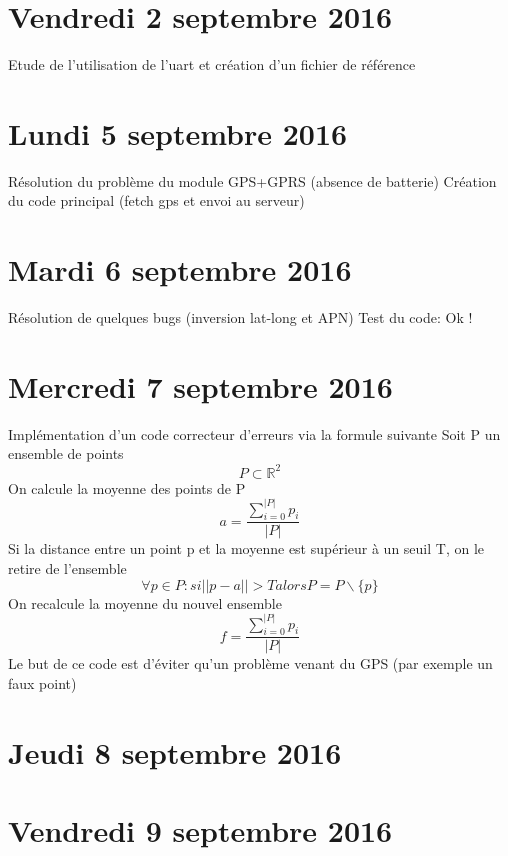 \documentclass[a4paper,11pt]{article}
\begin{document}
\section{Vendredi 2 septembre 2016}
Etude de l'utilisation de l'uart et création d'un fichier de référence

\section{Lundi 5 septembre 2016}
Résolution du problème du module GPS+GPRS (absence de batterie) \newline
Création du code principal (fetch gps et envoi au serveur) \newline

\section{Mardi 6 septembre 2016}
Résolution de quelques bugs (inversion lat-long et APN) \newline
Test du code: Ok !

\section{Mercredi 7 septembre 2016}
Implémentation d'un code correcteur d'erreurs via la formule suivante
Soit P un ensemble de points
\begin{equation*}
P \subset \mathbb{R}^2
\end{equation*}
On calcule la moyenne des points de P
\begin{equation*}
a = \frac{\sum\limits_{i=0}^{|P|} p_i}{|P|}
\end{equation*}
Si la distance entre un point p et la moyenne est supérieur à un seuil T, on le retire de l'ensemble
\begin{equation*}
\forall p \in P : si ||p-a|| > T  alors  P = P\backslash\{p\}
\end{equation*}
On recalcule la moyenne du nouvel ensemble
\begin{equation*}
f = \frac{\sum\limits_{i=0}^{|P|} p_i}{|P|}
\end{equation*}
Le but de ce code est d'éviter qu'un problème venant du GPS (par exemple un faux point)

\section{Jeudi 8 septembre 2016}


\section{Vendredi 9 septembre 2016}
\end{document}
